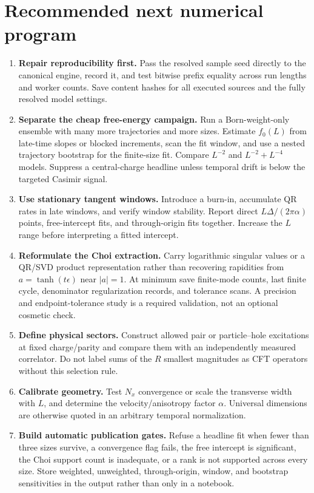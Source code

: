 \documentclass[aps,prb,onecolumn,nofootinbib,superscriptaddress]{revtex4-2}
\begin{document}
\section{Recommended next numerical program}

\begin{enumerate}
\item \textbf{Repair reproducibility first.}  Pass the resolved sample seed directly to the
canonical engine, record it, and test bitwise prefix equality across run lengths and worker
counts.  Save content hashes for all executed sources and the fully resolved model settings.

\item \textbf{Separate the cheap free-energy campaign.}  Run a Born-weight-only ensemble
with many more trajectories and more sizes.  Estimate $f_0(L)$ from late-time slopes or
blocked increments, scan the fit window, and use a nested trajectory bootstrap for the
finite-size fit.  Compare $L^{-2}$ and $L^{-2}+L^{-4}$ models.  Suppress a central-charge
headline unless temporal drift is below the targeted Casimir signal.

\item \textbf{Use stationary tangent windows.}  Introduce a burn-in, accumulate QR rates in
late windows, and verify window stability.  Report direct $L\Delta/(2\pi\alpha)$ points,
free-intercept fits, and through-origin fits together.  Increase the $L$ range before
interpreting a fitted intercept.

\item \textbf{Reformulate the Choi extraction.}  Carry logarithmic singular values or a
QR/SVD product representation rather than recovering rapidities from $a=\tanh(t\epsilon)$
near $|a|=1$.  At minimum save finite-mode counts, last finite cycle, denominator
regularization records, and tolerance scans.  A precision and endpoint-tolerance study is a
required validation, not an optional cosmetic check.

\item \textbf{Define physical sectors.}  Construct allowed pair or particle--hole
excitations at fixed charge/parity and compare them with an independently measured
correlator.  Do not label sums of the $R$ smallest magnitudes as CFT operators without this
selection rule.

\item \textbf{Calibrate geometry.}  Test $N_x$ convergence or scale the transverse width
with $L$, and determine the velocity/anisotropy factor $\alpha$.  Universal dimensions are
otherwise quoted in an arbitrary temporal normalization.

\item \textbf{Build automatic publication gates.}  Refuse a headline fit when fewer than
three sizes survive, a convergence flag fails, the free intercept is significant, the Choi
support count is inadequate, or a rank is not supported across every size.  Store weighted,
unweighted, through-origin, window, and bootstrap sensitivities in the output rather than
only in a notebook.
\end{enumerate}
\end{document}
